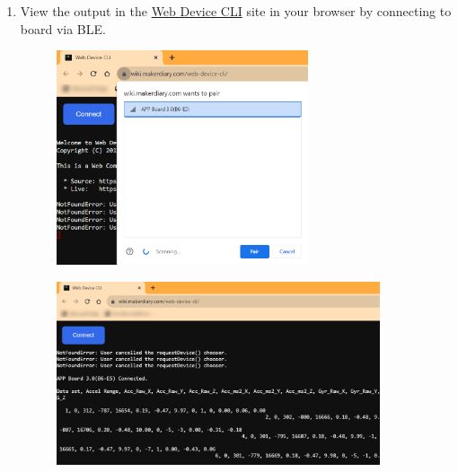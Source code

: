 \documentclass{article}
\begin{document}
\begin{enumerate}
	\item View the output in the \href{https://wiki.makerdiary.com/web-device-cli/}{Web Device CLI} site in your browser by connecting to board via BLE.
	\begin{figure}[H]
		\begin{center}
			\includegraphics[width=0.7\textwidth]{coinesAPI_images/Mcu_example_ble_pair.png}
		\end{center}
	\end{figure}
	\begin{figure}[H]
		\begin{center}
			\includegraphics[width=0.9\textwidth]{coinesAPI_images/Mcu_example_ble_output.png}
		\end{center}
	\end{figure}
\end{enumerate}
\end{document}
